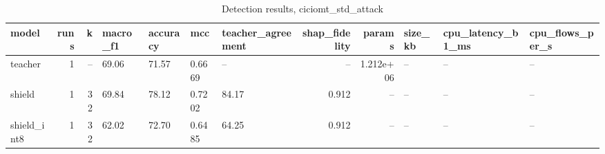 \begin{table}
\caption{Detection results, ciciomt_std_attack}
\begin{tabular}{lrrllllrrlll}
\toprule
model & runs & k & macro_f1 & accuracy & mcc & teacher_agreement & shap_fidelity & params & size_kb & cpu_latency_b1_ms & cpu_flows_per_s \\
\midrule
teacher & 1 & -- & 69.06 & 71.57 & 0.6669 & -- & -- & 1.212e+06 & -- & -- & -- \\
shield & 1 & 32 & 69.84 & 78.12 & 0.7202 & 84.17 & 0.912 & -- & -- & -- & -- \\
shield_int8 & 1 & 32 & 62.02 & 72.70 & 0.6485 & 64.25 & 0.912 & -- & -- & -- & -- \\
\bottomrule
\end{tabular}
\end{table}

